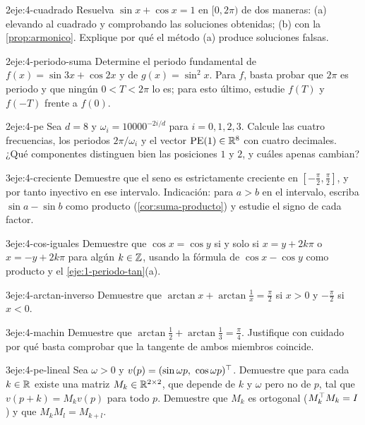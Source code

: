 \begin{ejercicio}{2}{eje:4-cuadrado}
Resuelva $\sin x+\cos x=1$ en $[0,2\pi)$ de dos maneras: (a) elevando al cuadrado y comprobando las soluciones obtenidas; (b) con la \cref{prop:armonico}. Explique por qué el método (a) produce soluciones falsas.
\end{ejercicio}

\begin{ejercicio}{2}{eje:4-periodo-suma}
Determine el periodo fundamental de $f(x)=\sin3x+\cos2x$ y de $g(x)=\sin^{2}x$. Para $f$, basta probar que $2\pi$ es periodo y que ningún $0<T<2\pi$ lo es; para esto último, estudie $f(T)$ y $f(-T)$ frente a $f(0)$.
\end{ejercicio}

\begin{ejercicio}{2}{eje:4-pe}
Sea $d=8$ y $\omega_i=10000^{-2i/d}$ para $i=0,1,2,3$. Calcule las cuatro frecuencias, los periodos $2\pi/\omega_i$ y el vector $\operatorname{PE}(1)\in\mathbb{R}^{8}$ con cuatro decimales. ¿Qué componentes distinguen bien las posiciones $1$ y $2$, y cuáles apenas cambian?
\end{ejercicio}

\begin{ejercicio}{3}{eje:4-creciente}
Demuestre que el seno es estrictamente creciente en $[-\frac{\pi}{2},\frac{\pi}{2}]$, y por tanto inyectivo en ese intervalo. Indicación: para $a>b$ en el intervalo, escriba $\sin a-\sin b$ como producto (\cref{cor:suma-producto}) y estudie el signo de cada factor.
\end{ejercicio}

\begin{ejercicio}{3}{eje:4-cos-iguales}
Demuestre que $\cos x=\cos y$ si y solo si $x=y+2k\pi$ o $x=-y+2k\pi$ para algún $k\in\mathbb{Z}$, usando la fórmula de $\cos x-\cos y$ como producto y el \cref{eje:1-periodo-tan}(a).
\end{ejercicio}

\begin{ejercicio}{3}{eje:4-arctan-inverso}
Demuestre que $\arctan x+\arctan\frac1x=\frac{\pi}{2}$ si $x>0$ y $-\frac{\pi}{2}$ si $x<0$.
\end{ejercicio}

\begin{ejercicio}{3}{eje:4-machin}
Demuestre que $\arctan\frac12+\arctan\frac13=\frac{\pi}{4}$. Justifique con cuidado por qué basta comprobar que la tangente de ambos miembros coincide.
\end{ejercicio}

\begin{ejercicio}{3}{eje:4-pe-lineal}
Sea $\omega>0$ y $v(p)=(\sin\omega p,\ \cos\omega p)^{\top}$. Demuestre que para cada $k\in\mathbb{R}$ existe una matriz $M_k\in\mathbb{R}^{2\times2}$, que depende de $k$ y $\omega$ pero no de $p$, tal que $v(p+k)=M_kv(p)$ para todo $p$. Demuestre que $M_k$ es ortogonal ($M_k^{\top} M_k=I$) y que $M_kM_l=M_{k+l}$.
\end{ejercicio}
